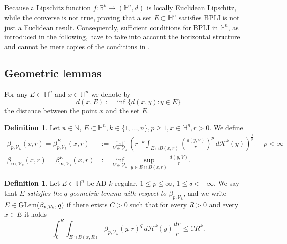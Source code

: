 \documentclass[12pt]{amsart}
\newcommand{\R}{\mathbb R}
\renewcommand{\H}{\mathbb H}
\newcommand{\diam}{{\rm diam}}
\numberwithin{equation}{section}
\theoremstyle{plain}
\theoremstyle{definition}
\newtheorem{definition}[theorem]{Definition}
\theoremstyle{remark}
\begin{document}


Because a Lipschitz function $f:\R^k\to(\H^n,d)$ is locally Euclidean Lipschitz, while the converse is not true, proving that a set $E\subset \H^n$ satisfies BPLI is not just a Euclidean result. Consequently, sufficient conditions for BPLI in $\mathbb{H}^n$, as introduced in the following, have to take into account the horizontal structure  and cannot be mere copies of 
 the conditions in \cite{David1}.


\subsection{Geometric lemmas}\label{s:GLem}

For any $E\subset \H^n$ and $x\in\H^n$ we denote by
\[d(x, E):=\inf\,\{d(x,y):y\in E\}\]
the distance between the point $x$ and the set $E$.
\begin{definition}\label{def_betaknumbers}
   Let $n\in \mathbb{N}$, $E\subset \H^n, k\in\{1,\ldots,n\}, p\geq 1, x\in\H^n, r>0$. We define
   \begin{align*}\beta_{p, \mathcal V_k}(x,r)=\beta^E_{p, \mathcal V_k}(x,r)&:=\inf_{V\in\mathcal V_k}\left(r^{-k}\int_{E\cap B(x,r)}\left(\frac{d(y,V)}{r}\right)^p\,d\mathcal H^k(y)\right)^\frac{1}{p},\quad p<\infty\\
  \beta_{\infty,\mathcal V_k}(x,r)= \beta^E_{\infty,\mathcal V_k}(x,r)&:=\inf_{V\in\mathcal V_k} \sup_{y\in E\cap B(x,r)} \frac{d(y,V)}{r}.
   \end{align*}
\end{definition}

\begin{definition}\label{def_geometriclemma}
    Let $E\subset \H^n$ be AD-$k$-regular, $1\leq p\leq\infty$, $1\leq q<+\infty$.  We say that \textit{$E$ satisfies the $q$-geometric lemma with respect to $\beta_{p,\mathcal V_k}$}, and we write  $E\in{\rm GLem}(\beta_{p,\mathcal V_k},q)$ if there exists $C>0$ such that for every $R>0$ and every $x\in E$ it holds
    \begin{equation}\label{geometriclemma}\int_0^R\int_{E\cap B(x,R)}\beta_{p, \mathcal V_k}(y,r)^q\,d\mathcal H^k(y)\frac{dr}{r}\leq CR^k.\end{equation}
    \end{definition}
\end{document}
